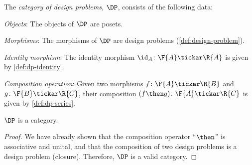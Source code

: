 \begin{definition}[Category $\DP$]
\label{define:DP}
The \emph{category of design problems, $\DP$}, consists of the following data:
%
\begin{compactenum}
\item \emph{Objects}: The objects of $\DP$ are posets.
\item \emph{Morphisms}: The morphisms of $\DP$ are design problems (\cref{def:design-problem}).
\item \emph{Identity morphism}: The identity morphism $\id_A \colon \F{A} \tickar \R{A}$ is given by \cref{def:dp-identity}.
\item \emph{Composition operation}: Given two morphisms $f \colon  \F{A} \tickar \R{B}$ and $g \colon \F{B} \tickar \R{C}$, their
composition $(f\then g)\colon  \F{A} \tickar \R{C}$ is
given by \cref{def:dp-series}.
\end{compactenum}
\end{definition}

\begin{lemma}
    $\DP$ is a category.
\end{lemma}
\begin{proof}
We have already shown that the composition operator ``$\then$'' is associative and unital, and that the composition of two design problems is a design problem (closure). Therefore, $\DP$ is a valid category.
\end{proof}